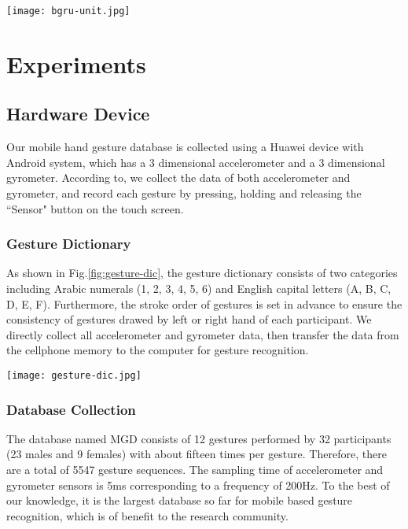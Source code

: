 \documentclass[review]{elsarticle}
\begin{document}
\begin{figure*}[h]
	\centering
\texttt{[image: bgru-unit.jpg]}
	\caption{BGRU unit.}
	\label{fig:bgru-unit}
\end{figure*}

\section{Experiments}\label{sec:experiments}
\subsection{Hardware Device}\label{sec:database}
Our mobile hand gesture database is collected using a Huawei device with Android system, which has a 3 dimensional accelerometer and a 3 dimensional gyrometer. According to\;\cite{lefebvre2013ANN}, we collect the data of both accelerometer and gyrometer, {and record each gesture by pressing, holding and releasing the ``Sensor" button on the touch screen.}

\subsubsection{Gesture Dictionary}
As shown in Fig.\;\ref{fig:gesture-dic}, the gesture dictionary consists of two categories including Arabic numerals (1, 2, 3, 4, 5, 6) and English capital letters (A, B, C, D, E, F). Furthermore, the stroke order of gestures is set in advance to ensure the consistency of gestures drawed by left or right hand of each participant.
We directly collect all accelerometer and gyrometer data, then transfer the data from the cellphone memory to the computer for gesture recognition.

\begin{figure*}[htbp]
	\normalsize
	\centering
	\texttt{[image: gesture-dic.jpg]}
	\caption{Examples of hand gestures in \textbf{{MGD} database}.}
	\label{fig:gesture-dic}\vspace*{4pt}
\end{figure*}

\subsubsection{Database Collection} The database named MGD consists of 12 gestures performed by 32 participants (23 males and 9 females) with about fifteen times per gesture. Therefore, there are a total of 5547 gesture sequences. The sampling time of accelerometer and gyrometer sensors is 5ms corresponding to a frequency of 200Hz. To the best of our knowledge, it is the largest database so far for mobile based gesture recognition, {which is of benefit to the research community}.
\end{document}
